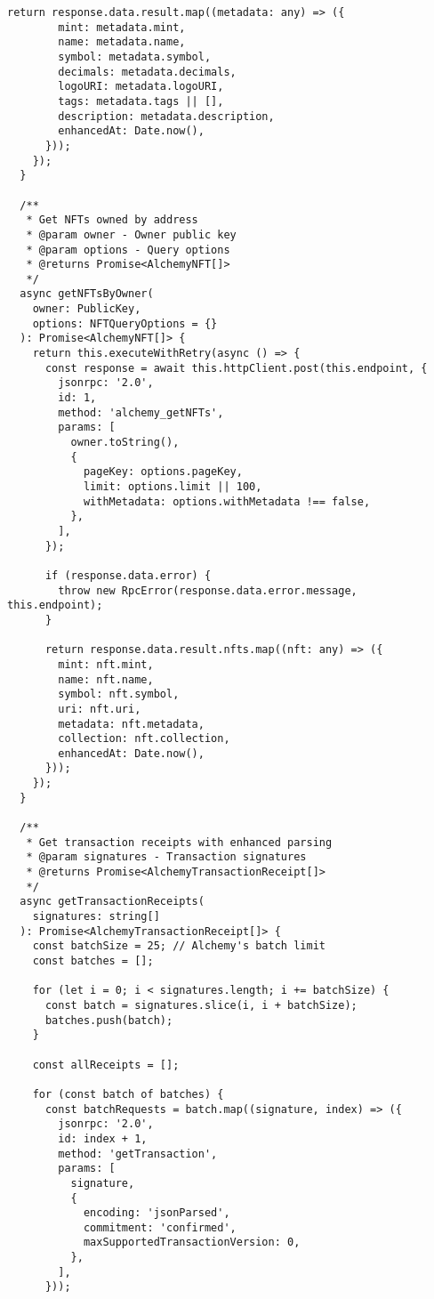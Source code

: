 \documentclass[11pt,a4paper]{article}
\begin{document}
\begin{lstlisting}[style=typescript, caption=Alchemy Service Implementation]
      return response.data.result.map((metadata: any) => ({
        mint: metadata.mint,
        name: metadata.name,
        symbol: metadata.symbol,
        decimals: metadata.decimals,
        logoURI: metadata.logoURI,
        tags: metadata.tags || [],
        description: metadata.description,
        enhancedAt: Date.now(),
      }));
    });
  }

  /**
   * Get NFTs owned by address
   * @param owner - Owner public key
   * @param options - Query options
   * @returns Promise<AlchemyNFT[]>
   */
  async getNFTsByOwner(
    owner: PublicKey,
    options: NFTQueryOptions = {}
  ): Promise<AlchemyNFT[]> {
    return this.executeWithRetry(async () => {
      const response = await this.httpClient.post(this.endpoint, {
        jsonrpc: '2.0',
        id: 1,
        method: 'alchemy_getNFTs',
        params: [
          owner.toString(),
          {
            pageKey: options.pageKey,
            limit: options.limit || 100,
            withMetadata: options.withMetadata !== false,
          },
        ],
      });

      if (response.data.error) {
        throw new RpcError(response.data.error.message, this.endpoint);
      }

      return response.data.result.nfts.map((nft: any) => ({
        mint: nft.mint,
        name: nft.name,
        symbol: nft.symbol,
        uri: nft.uri,
        metadata: nft.metadata,
        collection: nft.collection,
        enhancedAt: Date.now(),
      }));
    });
  }

  /**
   * Get transaction receipts with enhanced parsing
   * @param signatures - Transaction signatures
   * @returns Promise<AlchemyTransactionReceipt[]>
   */
  async getTransactionReceipts(
    signatures: string[]
  ): Promise<AlchemyTransactionReceipt[]> {
    const batchSize = 25; // Alchemy's batch limit
    const batches = [];
    
    for (let i = 0; i < signatures.length; i += batchSize) {
      const batch = signatures.slice(i, i + batchSize);
      batches.push(batch);
    }

    const allReceipts = [];
    
    for (const batch of batches) {
      const batchRequests = batch.map((signature, index) => ({
        jsonrpc: '2.0',
        id: index + 1,
        method: 'getTransaction',
        params: [
          signature,
          {
            encoding: 'jsonParsed',
            commitment: 'confirmed',
            maxSupportedTransactionVersion: 0,
          },
        ],
      }));


\end{lstlisting}
\end{document}
